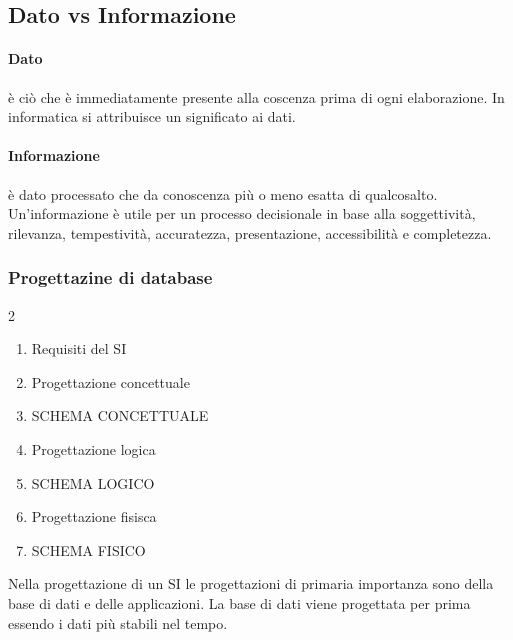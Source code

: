 \subsection{Dato vs Informazione}
\paragraph{Dato} è ciò che è immediatamente presente alla coscenza prima di ogni elaborazione. In informatica si attribuisce un significato ai dati.
\paragraph{Informazione} è dato processato che da conoscenza più o meno esatta di qualcosalto.
Un'informazione è utile per un processo decisionale in base alla soggettività, rilevanza, tempestività, accuratezza, presentazione, accessibilità e completezza.
\subsubsection{Progettazine di database}
\begin{paracol}{2}
	\begin{enumerate}
		\item Requisiti del SI
		\item Progettazione concettuale
		\item SCHEMA CONCETTUALE
		\item Progettazione logica
		\item SCHEMA LOGICO
		\item Progettazione fisisca
		\item SCHEMA FISICO
	\end{enumerate}
	\switchcolumn
	Nella progettazione di un SI le progettazioni di primaria importanza sono della base di dati e delle applicazioni. La base di dati viene progettata per prima essendo i dati più stabili nel tempo.
\end{paracol}


